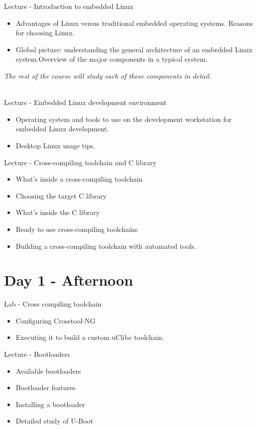 \documentclass[a4paper,12pt,obeyspaces,spaces,hyphens]{article}
\begin{document}
\feagendaonecolumn
{Lecture - Introduction to embedded Linux}
{
  \begin{itemize}
  \item Advantages of Linux versus traditional embedded operating systems.
        Reasons for choosing Linux.
  \item Global picture: understanding the general architecture of an
        embedded Linux system.Overview of the major components in a typical
        system.
  \end{itemize}
  {\em The rest of the course will study each of these components in detail.}
}
\\
\feagendatwocolumn
{Lecture - Embedded Linux development environment}
{
  \begin{itemize}
  \item Operating system and tools to use on the development
        workstation for embedded Linux development.
  \item Desktop Linux usage tips.
  \end{itemize}
}
{Lecture - Cross-compiling toolchain and C library}
{
  \begin{itemize}
  \item What's inside a cross-compiling toolchain
  \item Choosing the target C library
  \item What's inside the C library
  \item Ready to use cross-compiling toolchains
  \item Building a cross-compiling toolchain with automated tools.
  \end{itemize}
}

\section{Day 1 - Afternoon}
\feagendatwocolumn
{Lab - Cross compiling toolchain}
{
  \begin{itemize}
  \item Configuring Crosstool-NG
  \item Executing it to build a custom uClibc toolchain.
  \end{itemize}
}
{Lecture - Bootloaders}
{
  \begin{itemize}
  \item Available bootloaders
  \item Bootloader features
  \item Installing a bootloader
  \item Detailed study of U-Boot
  \end{itemize}
}
\\
\end{document}
